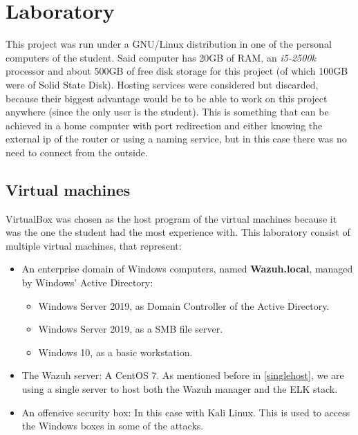 \section{Laboratory}
This project was run under a GNU/Linux distribution in one of the personal computers of the student.
Said computer has 20GB of RAM, an \textit{i5-2500k} processor and about 500GB of free disk storage for this project (of which 100GB were of Solid State Disk).
\linej
\linej
Hosting services were considered but discarded, because their biggest advantage would be to be able to work on this project anywhere (since the only user is the student). This is something that can be achieved in a home computer with port redirection and either knowing the external ip of the router or using a naming service, but in this case there was no need to connect from the outside.

\subsection{Virtual machines}
VirtualBox was chosen as the host program of the virtual machines because it was the one the student had the most experience with.
\linej
This laboratory consist of multiple virtual machines, that represent:
\begin{itemize}
	\item An enterprise domain of Windows computers, named \textbf{Wazuh.local}, managed by Windows' Active Directory:
		\begin{itemize}
			\item Windows Server 2019, as Domain Controller of the Active Directory.
			\item Windows Server 2019, as a SMB file server.
			\item Windows 10, as a basic workstation.
		\end{itemize}
	\item The Wazuh server: A CentOS 7. As mentioned before in \ref{singlehost}, we are using a single server to host both the Wazuh manager and the ELK stack.
	\item An offensive security box: In this case with Kali Linux. This is used to access the Windows boxes in some of the attacks.
\end{itemize}


